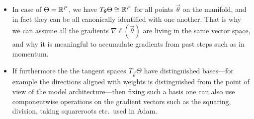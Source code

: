 \documentclass[12pt]{amsart}
\begin{document}
\begin{itemize}
\item In case of $\Theta = \mathbb{R}^P$, we have $T_{\mathbf{\boldsymbol{\theta}}} \Theta \cong \mathbb{R}^P$ for all points $\vec{\theta}$ on the manifold, and in fact they can be all canonically identified with one another. That is why we can assume all the gradients $\nabla \ell(\vec{\theta})$ are living in the same vector space, and why it is meaningful to accumulate gradients from past steps such as in momentum.
\item If furthermore the the tangent spaces $T_{\vec{\theta}}\Theta$ have distinguished bases---for example the directions aligned with weights is distinguished from the point of view of the model architecture---then fixing such a basis one can also use componentwise operations on the gradient vectors such as the squaring, division, taking squareroots etc.\ used in Adam.
\end{itemize}
\end{document}

